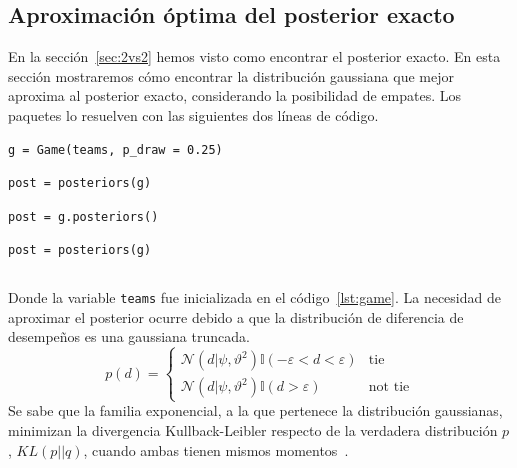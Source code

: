 \documentclass[a4paper,11pt]{book}
\newcommand{\N}{\mathcal{N}}
\theoremstyle{definition}
\begin{document}
\subsection{Aproximaci\'on \'optima del posterior exacto} \label{sec:approximate_posterior}
%
En la secci\'on~\ref{sec:2vs2} hemos visto como encontrar el posterior exacto.
%
En esta secci\'on mostraremos c\'omo encontrar la distribuci\'on gaussiana que mejor aproxima al posterior exacto, considerando la posibilidad de empates.
%
Los paquetes lo resuelven con las siguientes dos l\'ineas de c\'odigo.
%
\begin{lstlisting}[backgroundcolor=\color{all},belowskip=-0.77 \baselineskip]
g = Game(teams, p_draw = 0.25)
\end{lstlisting}
\begin{paracol}{3}
\begin{lstlisting}[backgroundcolor=\color{julia!60}, belowskip=0cm]
post = posteriors(g)
\end{lstlisting}
\switchcolumn
\begin{lstlisting}[backgroundcolor=\color{python!60}, belowskip=0cm]
post = g.posteriors()
\end{lstlisting}
\switchcolumn
\begin{lstlisting}[backgroundcolor=\color{r!50}, belowskip=0cm]
post = posteriors(g)
\end{lstlisting}
\end{paracol}
\begin{lstlisting}[captionpos=b,backgroundcolor=\color{white}, label=lst:post_2vs2, caption={Computando el posterior aproximado}, belowskip=0cm, aboveskip=0cm]
\end{lstlisting}
%
Donde la variable \texttt{teams} fue inicializada en el c\'odigo~\ref{lst:game}.
%
La necesidad de aproximar el posterior ocurre debido a que la distribuci\'on de diferencia de desempe\~nos es una gaussiana truncada.
%
\begin{equation}\label{eq:p_d}
p(d) =
\begin{cases}
\N(d|\psi,\vartheta^2) \mathbb{I}(-\varepsilon < d < \varepsilon) & \text{tie} \\
\N(d|\psi,\vartheta^2) \mathbb{I}(d > \varepsilon) & \text{not tie}
\end{cases}
\end{equation}
%
Se sabe que la familia exponencial, a la que pertenece la distribuci\'on gaussianas, minimizan la divergencia Kullback-Leibler respecto de la verdadera distribuci\'on $p$, $KL(p||q)$, cuando ambas tienen mismos momentos~\cite{Minka2005}.
\end{document}
